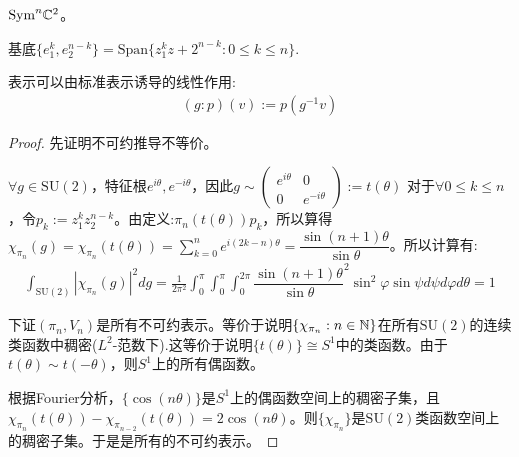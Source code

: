 \begin{example}[$\mathrm{SU}(2)$]
    $\mathrm{Sym}^n \mathbb{C}^2$。

    基底$\{e_1^k,e_2^{n-k}\}=\mathrm{Span}\{z_1^kz+2^{n-k}:0\leq k\leq n\}$.

    表示可以由标准表示诱导的线性作用:
    \begin{align*}
        (g:p)(v):=p(g^{-1}v)
    \end{align*}

    \begin{proof}
        先证明不可约推导不等价。

        $\forall g \in \mathrm{SU}(2)$，特征根$e^{i\theta},e^{-i\theta}$，因此$g \sim \begin{pmatrix}
            e^{i\theta}&0\\0&e^{-i\theta}
        \end{pmatrix}:=t(\theta)$
       对于$\forall 0\leq k \leq n$，令$p_k:=z_1^{k}z_2^{n-k}$。由定义:$\pi_n(t(\theta))p_k$，所以算得$\chi_{\pi_n}(g)=\chi_{\pi_n}(t(\theta))=\sum_{k=0}^n e^{i(2k-n)\theta}=\dfrac{\sin (n+1) \theta}{\sin \theta}$。所以计算有:
     \begin{align*}
        \int_{\mathrm{SU}(2)}|\chi_{\pi_n}(g)|^2dg=\frac{1}{2\pi^2}\int_0^\pi \int_0^\pi \int_0^{2\pi} \dfrac{\sin (n+1) \theta}{\sin \theta}^2\sin^2 \varphi \sin \psi d\psi d\varphi d\theta=1
     \end{align*}
    
    下证$(\pi_n,V_n)$是所有不可约表示。等价于说明$\{\chi_{\pi_n}:n \in \mathbb{N}\}$在所有$\mathrm{SU}(2)$的连续类函数中稠密($L^2$-范数下).这等价于说明$\{t(\theta)\}\cong S^1$中的类函数。由于$t(\theta)\sim t(-\theta)$，则$S^1$上的所有偶函数。

    根据Fourier分析，$\{\cos(n\theta)\}$是$S^1$上的偶函数空间上的稠密子集，且$\chi_{\pi_n}(t(\theta))-\chi_{\pi_{n-2}}(t(\theta))=2\cos(n\theta)$。则$\{\chi_{\pi_n}\}$是$\mathrm{SU}(2)$类函数空间上的稠密子集。于是是所有的不可约表示。
    \end{proof}
\end{example}

